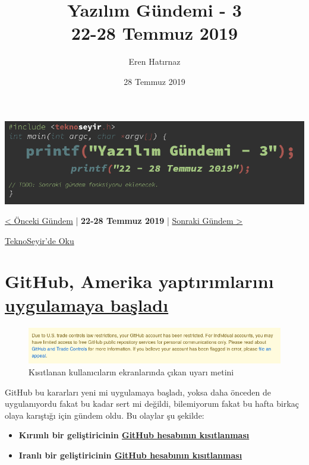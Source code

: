 \documentclass[11pt]{article}
\author{Eren Hatırnaz}
\date{28 Temmuz 2019}
\title{Yazılım Gündemi - 3\\\medskip
\large 22-28 Temmuz 2019}
\begin{document}
\maketitle
\tableofcontents \clearpage\shorthandoff{=}

\begin{center}
\includegraphics[width=.9\linewidth]{gorseller/yazilim-gundemi-banner.png}
\end{center}

\begin{center}
\href{../02/yazilim-gundemi-02.pdf}{< Önceki Gündem} | \textbf{22-28 Temmuz 2019} | \href{../04/yazilim-gundemi-04.pdf}{Sonraki Gündem >}

\href{https://teknoseyir.com/blog/yazilim-gundemi-3-22-28-temmuz-2019}{TeknoSeyir'de Oku}
\end{center}

\section{GitHub, Amerika yaptırımlarını \href{https://help.github.com/en/articles/github-and-trade-controls}{uygulamaya başladı}}
\label{sec:orgd8c945b}
\begin{figure}[htbp]
\centering
\includegraphics[width=.9\linewidth]{gorseller/github-amerika-yaptirimlari-1.png}
\caption{Kısıtlanan kullanıcıların ekranlarında çıkan uyarı metini}
\end{figure}

GitHub bu kararları yeni mi uygulamaya başladı, yoksa daha önceden de
uygulanıyordu fakat bu kadar sert mi değildi, bilemiyorum fakat bu hafta
birkaç olaya karıştığı için gündem oldu. Bu olaylar şu şekilde:

\begin{itemize}
\item \textbf{Kırımlı bir geliştiricinin \href{https://github.com/tkashkin/GameHub/issues/289}{GitHub hesabının kısıtlanması}}
\item \textbf{Iranlı bir geliştiricinin \href{https://medium.com/hamed/github-blocked-my-account-and-they-think-im-developing-nuclear-weapons-e7e1fe62cb74}{GitHub hesabının kısıtlanması}}
\end{itemize}
\end{document}

